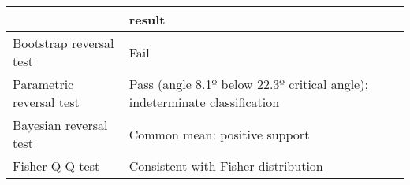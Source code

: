 \begin{tabular}{ll}
\toprule
{} &                                                                      result \\
\midrule
Bootstrap reversal test  &                                                                        Fail \\
Parametric reversal test &  Pass (angle 8.1º below 22.3º critical angle); indeterminate classification \\
Bayesian reversal test   &                                               Common mean: positive support \\
Fisher Q-Q test          &                                         Consistent with Fisher distribution \\
\bottomrule
\end{tabular}

